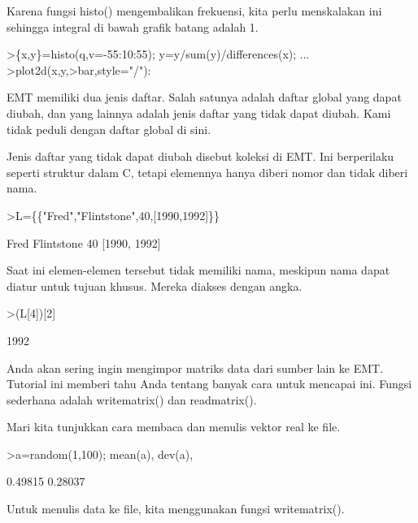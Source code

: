 \documentclass[a4paper,10pt]{article}
\begin{document}
\begin{eulernotebook}
\begin{eulercomment}
\begin{eulercomment}
\begin{eulercomment}
\begin{eulercomment}
\begin{eulercomment}
Karena fungsi histo() mengembalikan frekuensi, kita perlu menskalakan
ini sehingga integral di bawah grafik batang adalah 1.
\end{eulercomment}
\begin{eulerprompt}
>\{x,y\}=histo(q,v=-55:10:55); y=y/sum(y)/differences(x); ...
>plot2d(x,y,>bar,style="/"):
\end{eulerprompt}
\begin{eulercomment}
EMT memiliki dua jenis daftar. Salah satunya adalah daftar global yang
dapat diubah, dan yang lainnya adalah jenis daftar yang tidak dapat
diubah. Kami tidak peduli dengan daftar global di sini.

Jenis daftar yang tidak dapat diubah disebut koleksi di EMT. Ini
berperilaku seperti struktur dalam C, tetapi elemennya hanya diberi
nomor dan tidak diberi nama.
\end{eulercomment}
\begin{eulerprompt}
>L=\{\{"Fred","Flintstone",40,[1990,1992]\}\}
\end{eulerprompt}
\begin{euleroutput}
  Fred
  Flintstone
  40
  [1990,  1992]
\end{euleroutput}
\begin{eulercomment}
Saat ini elemen-elemen tersebut tidak memiliki nama, meskipun nama
dapat diatur untuk tujuan khusus. Mereka diakses dengan angka.
\end{eulercomment}
\begin{eulerprompt}
>(L[4])[2]
\end{eulerprompt}
\begin{euleroutput}
  1992
\end{euleroutput}
\begin{eulercomment}
\begin{eulercomment}
\begin{eulercomment}
Anda akan sering ingin mengimpor matriks data dari sumber lain ke EMT.
Tutorial ini memberi tahu Anda tentang banyak cara untuk mencapai ini.
Fungsi sederhana adalah writematrix() dan readmatrix().

Mari kita tunjukkan cara membaca dan menulis vektor real ke file.
\end{eulercomment}
\begin{eulerprompt}
>a=random(1,100); mean(a), dev(a),
\end{eulerprompt}
\begin{euleroutput}
  0.49815
  0.28037
\end{euleroutput}
\begin{eulercomment}
Untuk menulis data ke file, kita menggunakan fungsi writematrix().


\end{eulercomment}
\end{eulercomment}
\end{eulercomment}
\end{eulercomment}
\end{eulercomment}
\end{eulercomment}
\end{eulercomment}
\end{eulernotebook}
\end{document}
